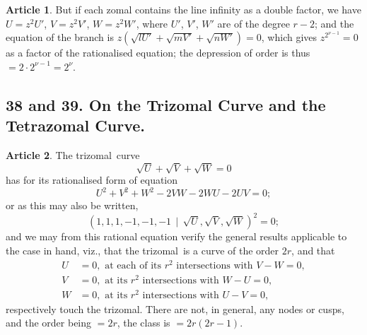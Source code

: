 \documentclass[11pt,a4paper]{article}
\theoremstyle{definition}
\newtheorem{art}{Article}
\newcommand{\trizomal}{trizomal}
\newcommand{\weighted}{\mathbin{\mid}}
\begin{document}
\begin{art}
But if each zomal contains the line infinity as a double factor, we have $U = z^{2}U'$, $V = z^{2}V'$, $W = z^{2}W'$, where $U'$, $V'$, $W'$ are of the degree $r - 2$; and the equation of the branch is $z(\sqrt{lU'} + \sqrt{mV'} + \sqrt{nW'}) = 0$, which gives $z^{2^{\nu-1}} = 0$ as a factor of the rationalised equation; the depression of order is thus $= 2 \cdot 2^{\nu-1} = 2^{\nu}$.
\end{art}



\subsection{38 and 39. On the Trizomal Curve and the Tetrazomal Curve.}

\begin{art}
The \trizomal\ curve
\[
\sqrt{U} + \sqrt{V} + \sqrt{W} = 0
\]
has for its rationalised form of equation
\[
U^{2} + V^{2} + W^{2} - 2VW - 2WU - 2UV = 0;
\]
or as this may also be written,
\[
(1, 1, 1, -1, -1, -1 \,\weighted\, \sqrt{U}, \sqrt{V}, \sqrt{W})^{2} = 0;
\]
and we may from this rational equation verify the general results applicable to the case in hand, viz., that the \trizomal\ is a curve of the order $2r$, and that
\begin{align*}
U &= 0, \text{ at each of its } r^{2} \text{ intersections with } V - W = 0, \\
V &= 0, \text{ at its } r^{2} \text{ intersections with } W - U = 0, \\
W &= 0, \text{ at its } r^{2} \text{ intersections with } U - V = 0,
\end{align*}
respectively touch the \trizomal. There are not, in general, any nodes or cusps, and the order being $= 2r$, the class is $= 2r(2r - 1)$.
\end{art}
\end{document}
